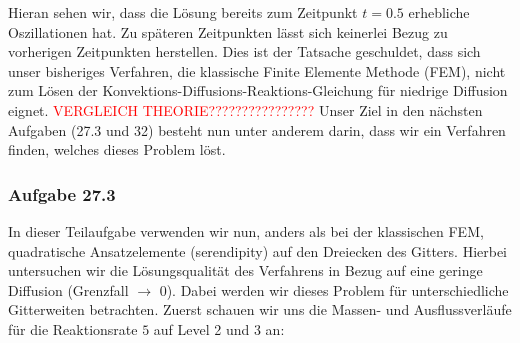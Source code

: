 Hieran sehen wir, dass die Lösung bereits zum Zeitpunkt $t=0.5$
erhebliche Oszillationen hat. Zu späteren Zeitpunkten lässt sich keinerlei Bezug zu vorherigen Zeitpunkten herstellen. Dies ist der Tatsache geschuldet, dass sich unser bisheriges Verfahren, die klassische Finite Elemente Methode (FEM), nicht zum Lösen der Konvektions-Diffusions-Reaktions-Gleichung für niedrige Diffusion eignet. \textcolor{red}{VERGLEICH THEORIE????????????????}
Unser Ziel in den nächsten Aufgaben (27.3 und 32) besteht nun unter anderem darin, dass wir ein Verfahren finden, welches dieses Problem löst.

\subsubsection{Aufgabe 27.3}
In dieser Teilaufgabe verwenden wir nun, anders als bei der klassischen FEM, quadratische Ansatzelemente (serendipity) auf den Dreiecken des Gitters. Hierbei untersuchen wir die Lösungsqualität des Verfahrens in Bezug auf eine geringe Diffusion (Grenzfall $\to$ 0). Dabei werden wir dieses Problem für unterschiedliche Gitterweiten betrachten.
Zuerst schauen wir uns die Massen- und Ausflussverläufe für die Reaktionsrate $5$ auf Level 2 und 3 an:
